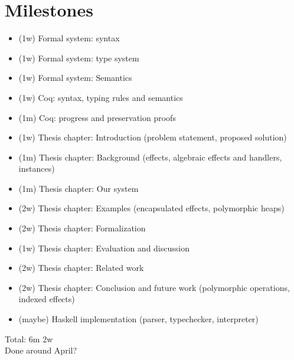 \documentclass[12pt]{article}
\begin{document}
\section{Milestones}
\begin{itemize}
\item (1w) Formal system: syntax
\item (1w) Formal system: type system
\item (1w) Formal system: Semantics
\item (1w) Coq: syntax, typing rules and semantics
\item (1m) Coq: progress and preservation proofs
\item (1w) Thesis chapter: Introduction (problem statement, proposed solution)
\item (1m) Thesis chapter: Background (effects, algebraic effects and handlers, instances)
\item (1m) Thesis chapter: Our system
\item (2w) Thesis chapter: Examples (encapsulated effects, polymorphic heaps)
\item (2w) Thesis chapter: Formalization
\item (1w) Thesis chapter: Evaluation and discussion
\item (2w) Thesis chapter: Related work
\item (2w) Thesis chapter: Conclusion and future work (polymorphic operations, indexed effects)
\item (maybe) Haskell implementation (parser, typechecker, interpreter) 
\end{itemize}

Total: 6m 2w \\
Done around April?
\end{document}
